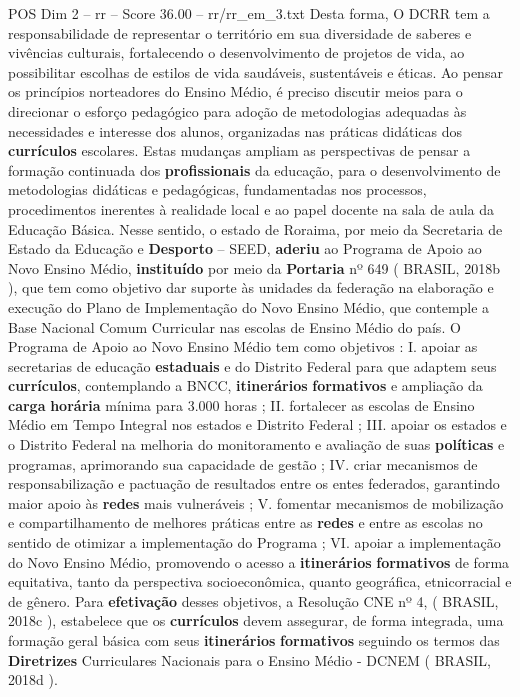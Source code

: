 \begin{textsample}{POS Dim 2 – rr – Score 36.00 – rr/rr\_em\_3.txt}
Desta forma, O DCRR tem a responsabilidade de representar o território em sua diversidade de saberes e vivências culturais, fortalecendo o desenvolvimento de projetos de vida, ao possibilitar escolhas de estilos de vida saudáveis, sustentáveis e éticas.
Ao pensar os princípios norteadores do Ensino Médio, é preciso discutir meios para o direcionar o esforço pedagógico para adoção de metodologias adequadas às necessidades e interesse dos alunos, organizadas nas práticas didáticas dos \textbf{currículos} escolares.
Estas mudanças ampliam as perspectivas de pensar a formação continuada dos \textbf{profissionais} da educação, para o desenvolvimento de metodologias didáticas e pedagógicas, fundamentadas nos processos, procedimentos inerentes à realidade local e ao papel docente na sala de aula da Educação Básica.
Nesse sentido, o estado de Roraima, por meio da Secretaria de Estado da Educação e \textbf{Desporto} – SEED, \textbf{aderiu} ao Programa de Apoio ao Novo Ensino Médio, \textbf{instituído} por meio da \textbf{Portaria} nº 649 ( BRASIL, 2018b ), que tem como objetivo dar suporte às unidades da federação na elaboração e execução do Plano de Implementação do Novo Ensino Médio, que contemple a Base Nacional Comum Curricular nas escolas de Ensino Médio do país.
O Programa de Apoio ao Novo Ensino Médio tem como objetivos : I. apoiar as secretarias de educação \textbf{estaduais} e do Distrito Federal para que adaptem seus \textbf{currículos}, contemplando a BNCC, \textbf{itinerários} \textbf{formativos} e ampliação da \textbf{carga} \textbf{horária} mínima para 3.000 horas ; II. fortalecer as escolas de Ensino Médio em Tempo Integral nos estados e Distrito Federal ; III. apoiar os estados e o Distrito Federal na melhoria do monitoramento e avaliação de suas \textbf{políticas} e programas, aprimorando sua capacidade de gestão ; IV. criar mecanismos de responsabilização e pactuação de resultados entre os entes federados, garantindo maior apoio às \textbf{redes} mais vulneráveis ; V. fomentar mecanismos de mobilização e compartilhamento de melhores práticas entre as \textbf{redes} e entre as escolas no sentido de otimizar a implementação do Programa ; VI. apoiar a implementação do Novo Ensino Médio, promovendo o acesso a \textbf{itinerários} \textbf{formativos} de forma equitativa, tanto da perspectiva socioeconômica, quanto geográfica, etnicorracial e de gênero.
Para \textbf{efetivação} desses objetivos, a Resolução CNE nº 4, ( BRASIL, 2018c ), estabelece que os \textbf{currículos} devem assegurar, de forma integrada, uma formação geral básica com seus \textbf{itinerários} \textbf{formativos} seguindo os termos das \textbf{Diretrizes} Curriculares Nacionais para o Ensino Médio - DCNEM ( BRASIL, 2018d ).

\end{textsample}

